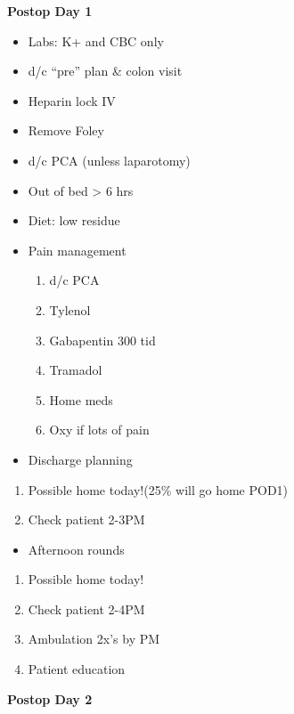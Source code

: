 \documentclass[
]{book}
\providecommand{\tightlist}{%
  \setlength{\itemsep}{0pt}\setlength{\parskip}{0pt}}
\begin{document}
\textbf{Postop Day 1}

\begin{itemize}
\tightlist
\item
  Labs: K+ and CBC only
\item
  d/c ``pre'' plan \& colon visit
\item
  Heparin lock IV
\item
  Remove Foley
\item
  d/c PCA (unless laparotomy)
\item
  Out of bed \textgreater{} 6 hrs
\item
  Diet: low residue
\item
  Pain management

  \begin{enumerate}
  \def\labelenumi{\arabic{enumi})}
  \tightlist
  \item
    d/c PCA
  \item
    Tylenol
  \item
    Gabapentin 300 tid
  \item
    Tramadol
  \item
    Home meds
  \item
    Oxy if lots of pain
  \end{enumerate}
\item
  Discharge planning
\end{itemize}

\begin{enumerate}
\def\labelenumi{\arabic{enumi})}
\tightlist
\item
  Possible home today!(25\% will go home POD1)
\item
  Check patient 2-3PM
\end{enumerate}

\begin{itemize}
\tightlist
\item
  Afternoon rounds
\end{itemize}

\begin{enumerate}
\def\labelenumi{\arabic{enumi})}
\tightlist
\item
  Possible home today!
\item
  Check patient 2-4PM
\item
  Ambulation 2x's by PM
\item
  Patient education
\end{enumerate}

\textbf{Postop Day 2}
\end{document}
